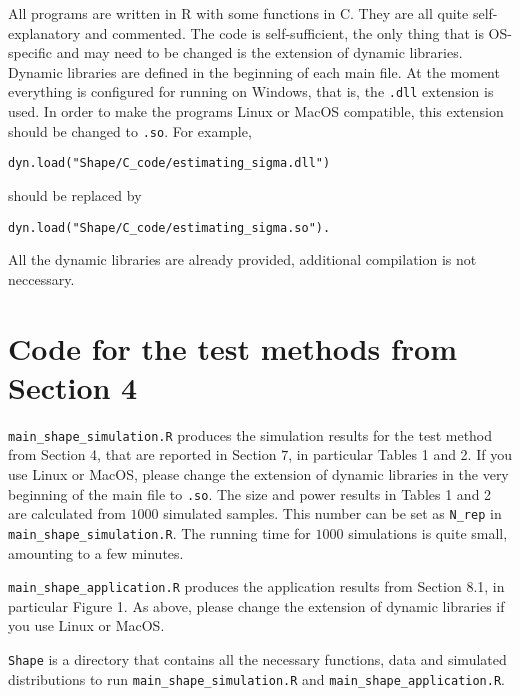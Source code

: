 \documentclass[a4paper,12pt]{article}
\begin{document}
All programs are written in R with some functions in C. They are all quite self-explanatory and commented. The code is self-sufficient, the only thing that is OS-specific and may need to be changed is the extension of dynamic libraries. Dynamic libraries are defined in the beginning of each main file. At the moment everything is configured for running on Windows, that is, the \verb|.dll| extension is used. In order to make the programs Linux or MacOS compatible, this extension should be changed to \verb|.so|. For example, 
\begin{verbatim}
dyn.load("Shape/C_code/estimating_sigma.dll")
\end{verbatim} should be replaced by
\begin{verbatim}
dyn.load("Shape/C_code/estimating_sigma.so").
\end{verbatim}
All the dynamic libraries are already provided, additional  compilation is not neccessary.



\newpage
\section*{Code for the test methods from Section 4}


\setlength{\parskip}{0.3cm}
\everypar{\hangafter=1\hangindent=1.45cm\relax}

\verb|main_shape_simulation.R| \hspace{1pt} produces the simulation results for the test method from Section 4, that are reported in Section $7$, in particular Tables 1 and 2. If you use Linux or MacOS, please change the extension of dynamic libraries in the very beginning of the main file to \verb|.so|. The size and power results in Tables 1 and 2 are calculated from $1000$ simulated samples. This number can be set as \verb|N_rep| in \verb|main_shape_simulation.R|. The running time for $1000$ simulations is quite small, amounting to a few minutes. 

\verb|main_shape_application.R| \hspace{1pt} produces the application results from Section 8.1, in particular Figure 1. As above, please change the extension of dynamic libraries if you use Linux or MacOS.

\verb|Shape| \hspace{1pt} is a directory that contains all the necessary functions, data and simulated distributions to run \verb|main_shape_simulation.R| and \verb|main_shape_application.R|.
\end{document}
